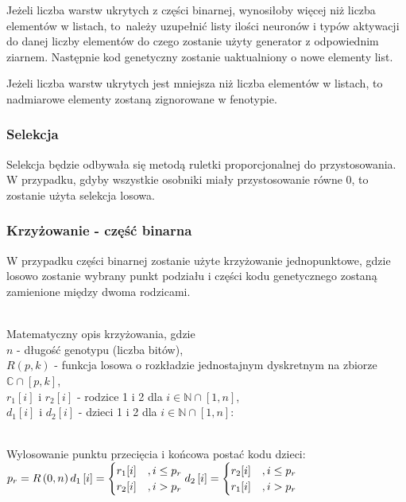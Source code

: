 \noindent
Jeżeli liczba warstw ukrytych z części binarnej,
wynosiłoby więcej niż liczba elementów w listach,
to~należy uzupełnić listy ilości neuronów
i typów aktywacji do danej liczby elementów do czego zostanie
użyty generator z odpowiednim ziarnem.
Następnie kod genetyczny zostanie uaktualniony o nowe elementy list.

\noindent
Jeżeli liczba warstw ukrytych jest mniejsza niż liczba elementów w listach,
to nadmiarowe elementy zostaną zignorowane w fenotypie.

\subsubsection{Selekcja}
Selekcja będzie odbywała się metodą ruletki proporcjonalnej do przystosowania.
W przypadku, gdyby wszystkie osobniki miały przystosowanie równe 0,
to zostanie użyta selekcja losowa.

\subsubsection{Krzyżowanie - część binarna}
W przypadku części binarnej zostanie użyte krzyżowanie jednopunktowe,
gdzie losowo zostanie wybrany punkt podziału i
części kodu genetycznego zostaną zamienione między dwoma rodzicami.

\noindent\\
Matematyczny opis krzyżowania, gdzie\\
$n$ - długość genotypu (liczba bitów),\\
$R\left(p, k\right)$ - funkcja losowa o rozkładzie jednostajnym dyskretnym
  na zbiorze $\mathbb{C} \cap \left[p, k\right]$,\\
$r_1\left[i\right]$ i $r_2\left[i\right]$ -
  rodzice 1 i 2 dla
  $i \in \mathbb{N} \cap \left[1, n\right]$,\\
$d_1\left[i\right]$ i $d_2\left[i\right]$ -
  dzieci 1 i 2 dla
  $i \in \mathbb{N} \cap \left[1, n\right]$:

\noindent\\
Wylosowanie punktu przecięcia i końcowa postać kodu dzieci:\\
$\displaystyle
  p_r=R\left(0, n\right)\\
  d_1\left[i\right]=\begin{cases}
    r_1[i]
      &, i \le p_r\\
    r_2[i]
      &, i>p_r\\
  \end{cases}\\
  d_2\left[i\right]=\begin{cases}
    r_2[i]
      &, i \le p_r\\
    r_1[i]
      &, i>p_r\\
  \end{cases}
$

